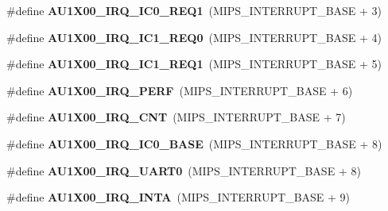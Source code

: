 \begin{DoxyCompactItemize}
\mbox{\label{group__bsp__interrupt_gaa2d98bbae6e0128997510cc3c3e8be34}} 
\#define {\bfseries A\+U1\+X00\+\_\+\+I\+R\+Q\+\_\+\+I\+C0\+\_\+\+R\+E\+Q1}~(M\+I\+P\+S\+\_\+\+I\+N\+T\+E\+R\+R\+U\+P\+T\+\_\+\+B\+A\+SE + 3)
\item 
\mbox{\label{group__bsp__interrupt_gad9690ef25ef4648e47c9ae2c6dd66ce5}} 
\#define {\bfseries A\+U1\+X00\+\_\+\+I\+R\+Q\+\_\+\+I\+C1\+\_\+\+R\+E\+Q0}~(M\+I\+P\+S\+\_\+\+I\+N\+T\+E\+R\+R\+U\+P\+T\+\_\+\+B\+A\+SE + 4)
\item 
\mbox{\label{group__bsp__interrupt_gaa0f7eb998c10b594c7bd7405db138208}} 
\#define {\bfseries A\+U1\+X00\+\_\+\+I\+R\+Q\+\_\+\+I\+C1\+\_\+\+R\+E\+Q1}~(M\+I\+P\+S\+\_\+\+I\+N\+T\+E\+R\+R\+U\+P\+T\+\_\+\+B\+A\+SE + 5)
\item 
\mbox{\label{group__bsp__interrupt_ga3f0e41bf6939edf9a5f50d54acaf368e}} 
\#define {\bfseries A\+U1\+X00\+\_\+\+I\+R\+Q\+\_\+\+P\+E\+RF}~(M\+I\+P\+S\+\_\+\+I\+N\+T\+E\+R\+R\+U\+P\+T\+\_\+\+B\+A\+SE + 6)
\item 
\mbox{\label{group__bsp__interrupt_ga8f90ec20226427f9c8326dbd65b128a9}} 
\#define {\bfseries A\+U1\+X00\+\_\+\+I\+R\+Q\+\_\+\+C\+NT}~(M\+I\+P\+S\+\_\+\+I\+N\+T\+E\+R\+R\+U\+P\+T\+\_\+\+B\+A\+SE + 7)
\item 
\mbox{\label{group__bsp__interrupt_ga2aa5a0ebfbb0ff483f5aa1e59cd87213}} 
\#define {\bfseries A\+U1\+X00\+\_\+\+I\+R\+Q\+\_\+\+I\+C0\+\_\+\+B\+A\+SE}~(M\+I\+P\+S\+\_\+\+I\+N\+T\+E\+R\+R\+U\+P\+T\+\_\+\+B\+A\+SE + 8)
\item 
\mbox{\label{group__bsp__interrupt_ga61eb07a7cc666fb86971af2f8d5ad011}} 
\#define {\bfseries A\+U1\+X00\+\_\+\+I\+R\+Q\+\_\+\+U\+A\+R\+T0}~(M\+I\+P\+S\+\_\+\+I\+N\+T\+E\+R\+R\+U\+P\+T\+\_\+\+B\+A\+SE + 8)
\item 
\mbox{\label{group__bsp__interrupt_ga9a59e546ed34a68ca5f2e2c46b540ec4}} 
\#define {\bfseries A\+U1\+X00\+\_\+\+I\+R\+Q\+\_\+\+I\+N\+TA}~(M\+I\+P\+S\+\_\+\+I\+N\+T\+E\+R\+R\+U\+P\+T\+\_\+\+B\+A\+SE + 9)
\item 

\end{DoxyCompactItemize}

